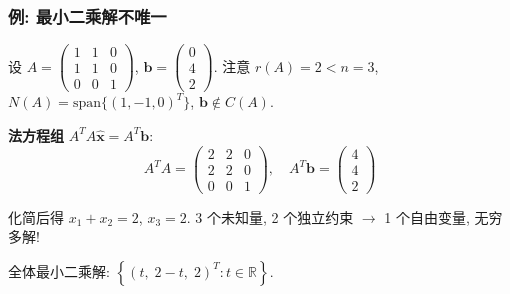 
\begin{frame}
\frametitle{例: 最小二乘解不唯一}

设 $A = \begin{pmatrix}1 & 1 & 0 \\ 1 & 1 & 0 \\ 0 & 0 & 1\end{pmatrix}$, $\mathbf{b} = \begin{pmatrix}0\\4\\2\end{pmatrix}$.
注意 $r(A) = 2 < n = 3$, $N(A) = \mathrm{span}\{(1,-1,0)^T\}$, $\mathbf{b}\notin C(A)$.

\pause
\vspace{0.5em}

\textbf{法方程组} $A^TA\hat{\mathbf{x}} = A^T\mathbf{b}$:
\[A^TA = \begin{pmatrix}2&2&0\\2&2&0\\0&0&1\end{pmatrix}, \quad A^T\mathbf{b} = \begin{pmatrix}4\\4\\2\end{pmatrix}\]

化简后得 $x_1+x_2 = 2$, $x_3 = 2$.
{\color{red}3 个未知量, 2 个独立约束 $\to$ 1 个自由变量, 无穷多解!}

\pause
\vspace{0.3em}

全体最小二乘解: $\left\{(t,\; 2-t,\; 2)^T : t\in\mathbb{R}\right\}$.

\end{frame}


